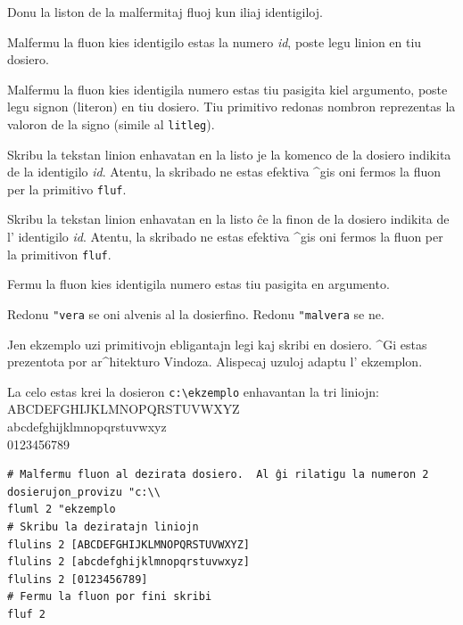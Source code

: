 
Donu la liston de la malfermitaj fluoj kun iliaj identigiloj.


Malfermu la fluon kies identigilo estas la numero \textit{id}, poste
legu linion en tiu dosiero.


Malfermu la fluon kies identigila numero estas tiu pasigita kiel
argumento, poste legu signon (literon) en tiu dosiero.  Tiu primitivo
redonas nombron reprezentas la valoron de la signo
(simile al \texttt{litleg}).


Skribu la tekstan linion enhavatan en la listo je la komenco de la
dosiero indikita de la identigilo \textit{id}.  Atentu, la skribado ne
estas efektiva ^gis oni fermos la fluon per la primitivo
\texttt{fluf}.


Skribu la tekstan linion enhavatan en la listo ĉe la finon de la
dosiero indikita de l' identigilo \textit{id}.  Atentu, la skribado ne
estas efektiva ^gis oni fermos la fluon per la primitivon
\texttt{fluf}.


Fermu la fluon kies identigila numero estas tiu pasigita en argumento.


Redonu \texttt{"vera} se oni alvenis al la dosierfino.  Redonu
\texttt{"malvera} se ne.

Jen ekzemplo uzi primitivojn ebligantajn legi kaj skribi en dosiero.
^Gi estas prezentota por ar^hitekturo Vindoza.  Alispecaj uzuloj
adaptu l' ekzemplon.

La celo estas krei la dosieron \texttt{c:\textbackslash ekzemplo}
enhavantan la tri liniojn:\\
ABCDEFGHIJKLMNOPQRSTUVWXYZ \\ 
abcdefghijklmnopqrstuvwxyz \\
0123456789 

\begin{verbatim}
# Malfermu fluon al dezirata dosiero.  Al ĝi rilatigu la numeron 2
dosierujon_provizu "c:\\
fluml 2 "ekzemplo
# Skribu la deziratajn liniojn
flulins 2 [ABCDEFGHIJKLMNOPQRSTUVWXYZ]
flulins 2 [abcdefghijklmnopqrstuvwxyz]
flulins 2 [0123456789]
# Fermu la fluon por fini skribi
fluf 2
\end{verbatim}

